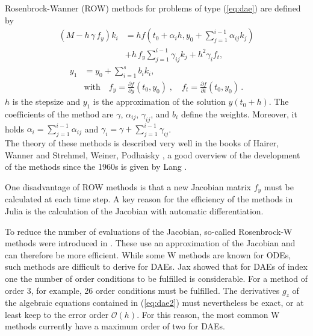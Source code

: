 \documentclass{juliacon}
\begin{document}
Rosenbrock-Wanner (ROW) methods for problems of type (\ref{eq:dae}) are defined by
\begin{align}
(M - h \, \gamma \, f_y) k_i &= h f(t_0+ \alpha_i h, y_0 + \sum_{j=1}^{i-1} \alpha_{ij} k_j) 
\nonumber \\ &
+ h \, f_y \sum_{j=1}^{i-1} \gamma_{ij}  k_j + h^2 \gamma_i f_t , \label{eq_row1} %
\end{align}
\begin{align}
y_1 &= y_0 + \sum_{i=1}^{s} b_i k_i,  \label{eq_row2} \quad \\
& \mbox{with} \quad f_y = \frac{\partial f}{\partial y}(t_0,y_0) \; , \quad f_t = \frac{\partial f}{\partial t}(t_0,y_0) \, . \nonumber
\end{align}
$h$ is the stepsize and $y_1$ is the approximation of the solution $y(t_0+h)$.
The coefficients of the method are $\gamma$, $\alpha_{ij}$, $\gamma_{ij}$, and $b_i$ define the weights. Moreover, it holds $\alpha_i = \sum_{j=1}^{i-1} \alpha_{ij}$ and
$\gamma_i = \gamma + \sum_{j=1}^{i-1} \gamma_{ij}$.\\

The theory of these methods is described very well in the books of Hairer, Wanner \cite{hairer} and Strehmel, Weiner, Podhaisky \cite{strehmel}, 
a good overview of the development of the methods since the 1960s is given by Lang \cite{lang}.

One disadvantage of ROW methods is that a new Jacobian matrix $f_y$ must be calculated at each time step.
A key reason for the efficiency of the methods in Julia is the calculation of the Jacobian with automatic differentiation.

To reduce the number of evaluations of the Jacobian, so-called Rosenbrock-W methods were introduced in \cite{steihaug}. 
These use an approximation of the Jacobian and can therefore be more efficient.
While some W methods are known for ODEs, such methods are difficult to derive for DAEs. Jax \cite{jax2} showed that for DAEs of index one the number of order conditions 
to be fulfilled is considerable. For a method of order 3, for example, 26 order conditions must be fulfilled. 
The derivatives $g_z$ of the algebraic equations contained in (\ref{eq:dae2}) must nevertheless be exact, or at least keep to the error order 
$\mathcal{O}(h)$. 
For this reason, the most common W methods currently have a maximum order of two for DAEs.
\end{document}
